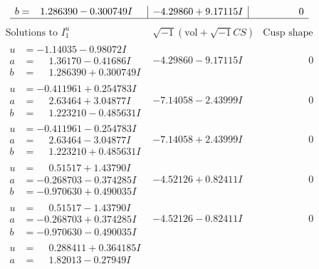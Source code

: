 \documentclass[1p]{elsarticle_modified}
\theoremstyle{definition}
\newcommand{\I}{\sqrt{-1}}
\begin{document}
$$\begin{array}{c|c|c}
\begin{aligned}
b &= \phantom{-}1.286390 - 0.300749 I\end{aligned}
 & -4.29860 + 9.17115 I & \phantom{-0.000000 } 0\\
 \hline 
 \end{array}$$\newpage$$\begin{array}{c|c|c}  
\text{Solutions to }I^u_{1}& \I (\text{vol} + \sqrt{-1}CS) & \text{Cusp shape}\\
 \hline 
\begin{aligned}
u &= -1.14035 - 0.98072 I \\
a &= \phantom{-}1.36170 - 0.41686 I \\
b &= \phantom{-}1.286390 + 0.300749 I\end{aligned}
 & -4.29860 - 9.17115 I & \phantom{-0.000000 } 0 \\ \hline\begin{aligned}
u &= -0.411961 + 0.254783 I \\
a &= \phantom{-}2.63464 + 3.04877 I \\
b &= \phantom{-}1.223210 - 0.485631 I\end{aligned}
 & -7.14058 - 2.43999 I & \phantom{-0.000000 } 0 \\ \hline\begin{aligned}
u &= -0.411961 - 0.254783 I \\
a &= \phantom{-}2.63464 - 3.04877 I \\
b &= \phantom{-}1.223210 + 0.485631 I\end{aligned}
 & -7.14058 + 2.43999 I & \phantom{-0.000000 } 0 \\ \hline\begin{aligned}
u &= \phantom{-}0.51517 + 1.43790 I \\
a &= -0.268703 - 0.374285 I \\
b &= -0.970630 + 0.490035 I\end{aligned}
 & -4.52126 + 0.82411 I & \phantom{-0.000000 } 0 \\ \hline\begin{aligned}
u &= \phantom{-}0.51517 - 1.43790 I \\
a &= -0.268703 + 0.374285 I \\
b &= -0.970630 - 0.490035 I\end{aligned}
 & -4.52126 - 0.82411 I & \phantom{-0.000000 } 0 \\ \hline\begin{aligned}
u &= \phantom{-}0.288411 + 0.364185 I \\
a &= \phantom{-}1.82013 - 0.27949 I \\

\end{aligned}
\end{array}$$
\end{document}
